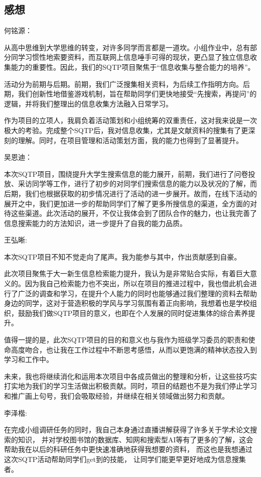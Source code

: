 \subsection{感想}
何铭源：
\begin{notebox}
  从高中思维到大学思维的转变，对许多同学而言都是一道坎。小组作业中，总有部分同学习惯性地索要资料，而互联网上信息唾手可得的现状，更凸显了独立信息收集能力的重要性。因此，我们的SQTP项目聚焦于“信息收集与整合能力的培养”。

活动分为前期与后期。前期，我们广泛搜集相关资料，为后续工作指明方向。后期，我们创新性地借鉴游戏机制，旨在帮助同学们更快地接受“先搜索，再提问”的逻辑，并将我们整理出的信息收集方法融入日常学习。

作为项目的立项人，我肩负着活动策划和小组统筹的双重责任，这对我来说是一次极大的考验。完成整个SQTP后，我对信息收集，尤其是文献资料的搜集有了更深刻的理解。同时，在项目管理和活动策划方面，我的能力也得到了显著提升。
\end{notebox}
吴恩迪：
\begin{notebox}
  本次SQTP项目，围绕提升大学生搜索信息的能力展开，前期，我们进行了问卷投放、采访同学等工作，进行了初步的对同学们搜索信息的能力以及状况的了解，而后期，我们也根据获取的初步情况进行了活动的进一步展开。故而，在线下活动的展开之中，我们更加进一步的帮助同学们了解了更多所搜信息的渠道，全方面的对待这些渠道。此次活动的展开，不仅让我体会到了团队合作的魅力，也让我完善了信息搜索能力的方法知识，进一步提升了自我的能力品质。
\end{notebox}
王弘晰:
\begin{notebox}
  本次SQTP项目不知不觉走向了尾声。我为能参与其中，作出贡献感到自豪。

  此次项目聚焦于大一新生信息检索能力提升，我认为是非常贴合实际，有着巨大意义的。因为我自己检索能力也不突出，所以在项目的推进过程中，我也借此机会进行了广泛的调查和学习，在提升个人能力的同时也能够通过我们整理的资料去帮助身边的同学，这对于营造积极的学风与学习氛围有着正向影响，我想着也是学校组织，鼓励我们做SQTP项目的意义，也即在个人发展的同时促进集体的综合素养提升。

  值得一提的是，此次SQTP项目的目的和意义也与我作为班级学习委员的职责和使命高度吻合，也让我在工作过程中不断思考感悟，从而以更饱满的精神状态投入到学习和工作中。

  未来，我也将继续消化和运用本次项目中各成员做出的整理和分析，让这些技巧实打实地为我们的学习生活做出积极贡献。同时，项目的结题也不是为我们停止学习和推广画上句号，我们会吸取经验，并继续在相关领域做出努力和贡献。
\end{notebox}
李泽楷:
\begin{notebox}
  在完成小组调研任务的同时，我自己本身通过直播讲解获得了许多关于学术论文搜索的知识，
  并对学校图书馆的数据库、知网和搜索型AI等有了更多的了解，这会帮助我在以后的科研任务中更快速准确地获得我想要的资料，
  而这也是我想通过这次SQTP活动帮助同学们get到的技能，
  让同学们能更早更好地成为信息搜集者。
\end{notebox}
